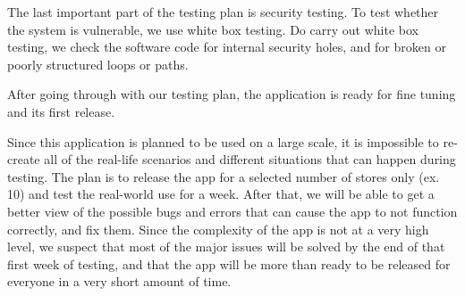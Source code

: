 The last important part of the testing plan is security testing. To test whether the system is vulnerable, we use white box testing. Do carry out white box testing, we check the software code for internal security holes, and for broken or poorly structured loops or paths. 

After going through with our testing plan, the application is ready for fine tuning and its first release. \newline

 

Since this application is planned to be used on a large scale, it is impossible to re-create all of the real-life scenarios and different situations that can happen during testing. The plan is to release the app for a selected number of stores only (ex. 10) and test the real-world use for a week. After that, we will be able to get a better view of the possible bugs and errors that can cause the app to not function correctly, and fix them. Since the complexity of the app is not at a very high level, we suspect that most of the major issues will be solved by the end of that first week of testing, and that the app will be more than ready to be released for everyone in a very short amount of time.